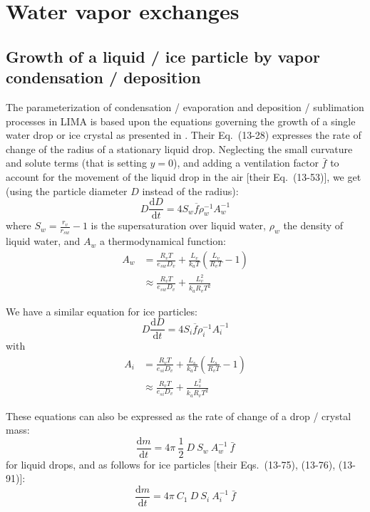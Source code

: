 \section{Water vapor exchanges}

\subsection{Growth of a liquid / ice particle by vapor condensation / deposition}

The parameterization of condensation / evaporation and deposition / sublimation processes in LIMA is based upon the equations governing the growth of a single water drop or ice crystal as presented in \citet{Pruppacher1997}. Their Eq.\ (13-28) expresses the rate of change of the radius of a stationary liquid drop. Neglecting the small curvature and solute terms (that is setting $y=0$), and adding a ventilation factor $\bar{f}$ to account for the movement of the liquid drop in the air [their Eq.\ (13-53)], we get (using the particle diameter $D$ instead of the radius):
\begin{equation}
\label{size-evol-liquid}
 D \frac{\mathrm{d}D}{\mathrm{d}t} = 4 S_w \overline{f} \rho_w^{-1} A_w^{-1}
\end{equation}
where $S_w = \frac{r_v}{r_{sw}} -1$ is the supersaturation over liquid water, $\rho_w$ the density of liquid water, and $A_w$ a thermodynamical function:
\begin{align}
 A_w &= \frac{R_v T}{e_{sw} D_v} + \frac{L_v}{k_a T} \left( \frac{L_v}{R_v T} - 1 \right) \\
\label{Aw}
 &\approx \frac{R_v T}{e_{sw} D_v} + \frac{L_v^2}{k_a R_v T^2}
\end{align}

We have a similar equation for ice particles:
\begin{equation}
\label{size-evol-ice}
 D \frac{\mathrm{d}D}{\mathrm{d}t} = 4 S_i \overline{f} \rho_i^{-1} A_i^{-1}
\end{equation}
with
\begin{align}
 A_i &= \frac{R_v T}{e_{si} D_v} + \frac{L_s}{k_a T} \left( \frac{L_s}{R_v T} - 1 \right) \\
\label{Ai}
 &\approx \frac{R_v T}{e_{si} D_v} + \frac{L_s^2}{k_a R_v T^2}
\end{align}

These equations can also be expressed as the rate of change of a drop / crystal mass:
\begin{equation}
\label{mass-evol-liquid}
 \frac{\mathrm{d}m}{\mathrm{d}t} = 4\pi ~ \frac{1}{2} ~ D ~ S_w ~ A_w^{-1} ~ \bar{f} 
\end{equation}
for liquid drops, and as follows for ice particles [their Eqs.\ (13-75), (13-76), (13-91)]:
\begin{equation}
\label{mass-evol-ice}
 \frac{\mathrm{d}m}{\mathrm{d}t} = 4\pi ~ C_1 ~ D ~ S_i ~ A_i^{-1} ~ \bar{f} 
\end{equation}

